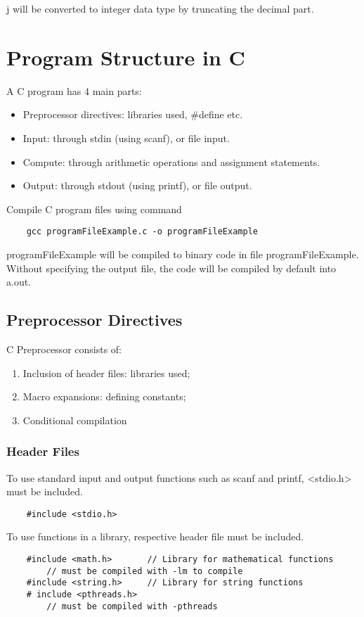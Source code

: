 \documentclass[12pt]{article} %
\begin{document}
j will be converted to integer data type by truncating the decimal part.

\section{Program Structure in C}
A C program has 4 main parts:
\begin{itemize}
    \item Preprocessor directives: libraries used, \#define etc.
    \item Input: through stdin (using scanf), or file input.
    \item Compute: through arithmetic operations and assignment statements.
    \item Output: through stdout (using printf), or file output.
\end{itemize}
Compile C program files using command
\begin{lstlisting}
    gcc programFileExample.c -o programFileExample
\end{lstlisting}
programFileExample will be compiled to binary code in file programFileExample.
Without specifying the output file, the code will be compiled by default into a.out.
\subsection{Preprocessor Directives}
C Preprocessor consists of: 
\begin{enumerate}
    \item Inclusion of header files: libraries used;
    \item Macro expansions: defining constants;
    \item Conditional compilation
\end{enumerate}
\subsubsection{Header Files}
To use standard input and output functions such as scanf and printf, <stdio.h> must be included.
\begin{lstlisting}
    #include <stdio.h>
\end{lstlisting}
To use functions in a library, respective header file must be included.
\begin{lstlisting}
    #include <math.h>       // Library for mathematical functions   
        // must be compiled with -lm to compile
    #include <string.h>     // Library for string functions
    # include <pthreads.h>  
        // must be compiled with -pthreads
\end{lstlisting}
\end{document}
